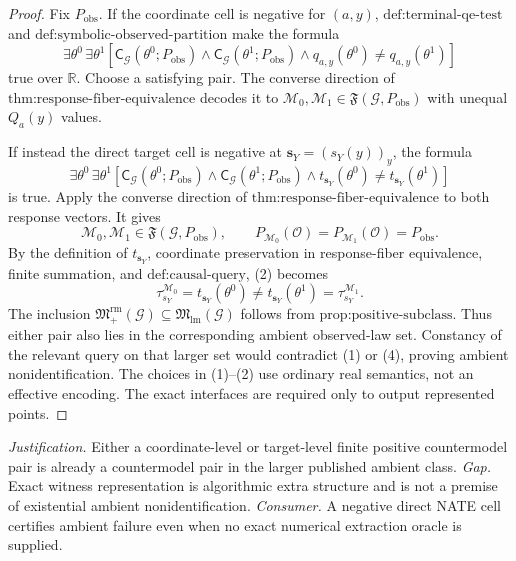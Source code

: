 \documentclass{article}
\begin{document}
\begin{proof}
Fix \(P_{\mathrm{obs}}\). If the coordinate cell is negative for \((a,y)\), \(\text{def:terminal-qe-test}\) and \(\text{def:symbolic-observed-partition}\) make the formula
\[
\exists\theta^0\,\exists\theta^1
\left[
\mathsf C_{\mathcal G}(\theta^0;P_{\mathrm{obs}})
\wedge\mathsf C_{\mathcal G}(\theta^1;P_{\mathrm{obs}})
\wedge q_{a,y}(\theta^0)\neq q_{a,y}(\theta^1)
\right]
\tag{1}
\]
true over \(\mathbb R\). Choose a satisfying pair. The converse direction of \(\text{thm:response-fiber-equivalence}\) decodes it to \(\mathcal M_0,\mathcal M_1\in\mathfrak F(\mathcal G,P_{\mathrm{obs}})\) with unequal \(Q_a(y)\) values.

If instead the direct target cell is negative at \(\mathbf s_Y=(s_Y(y))_y\), the formula
\[
\exists\theta^0\,\exists\theta^1
\left[
\mathsf C_{\mathcal G}(\theta^0;P_{\mathrm{obs}})
\wedge\mathsf C_{\mathcal G}(\theta^1;P_{\mathrm{obs}})
\wedge t_{\mathbf s_Y}(\theta^0)\neq t_{\mathbf s_Y}(\theta^1)
\right]
\tag{2}
\]
is true. Apply the converse direction of \(\text{thm:response-fiber-equivalence}\) to both response vectors. It gives
\[
\mathcal M_0,\mathcal M_1\in\mathfrak F(\mathcal G,P_{\mathrm{obs}}),
\qquad
P_{\mathcal M_0}(\mathcal O)=P_{\mathcal M_1}(\mathcal O)=P_{\mathrm{obs}}.
\tag{3}
\]
By the definition of \(t_{\mathbf s_Y}\), coordinate preservation in response-fiber equivalence, finite summation, and \(\text{def:causal-query}\), (2) becomes
\[
\tau_{s_Y}^{\mathcal M_0}=t_{\mathbf s_Y}(\theta^0)
\neq t_{\mathbf s_Y}(\theta^1)=\tau_{s_Y}^{\mathcal M_1}.
\tag{4}
\]
The inclusion \(\mathfrak M_{+}^{\mathrm{rm}}(\mathcal G)\subseteq\mathfrak M_{\mathrm{lm}}(\mathcal G)\) follows from \(\text{prop:positive-subclass}\). Thus either pair also lies in the corresponding ambient observed-law set. Constancy of the relevant query on that larger set would contradict (1) or (4), proving ambient nonidentification. The choices in (1)--(2) use ordinary real semantics, not an effective encoding. The exact interfaces are required only to output represented points.
\end{proof}
\par\smallskip\noindent \textit{Justification.} Either a coordinate-level or target-level finite positive countermodel pair is already a countermodel pair in the larger published ambient class. \textit{Gap.} Exact witness representation is algorithmic extra structure and is not a premise of existential ambient nonidentification. \textit{Consumer.} A negative direct NATE cell certifies ambient failure even when no exact numerical extraction oracle is supplied.
\end{document}
